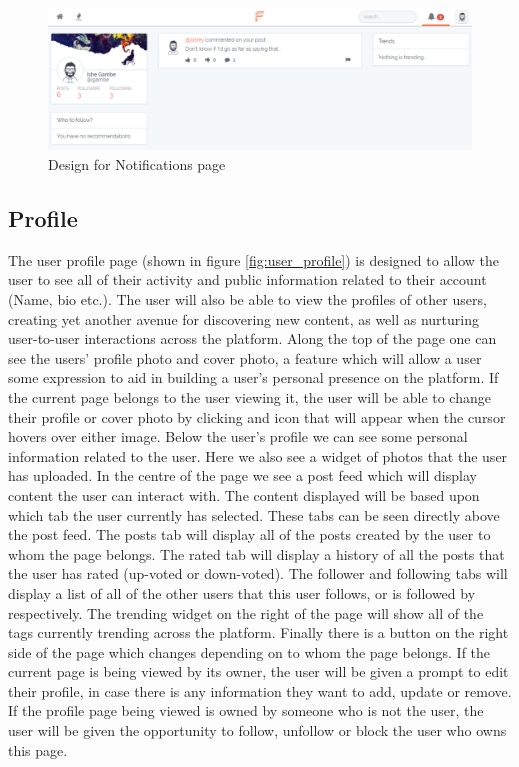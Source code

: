 \begin{figure}[H]
\centering
\includegraphics[width=1\linewidth]{Images/Design/notifications-page}
\caption{Design for Notifications page}
\label{fig:notifications-page}
\end{figure}

\subsection{Profile}
The user profile page (shown in figure \ref{fig:user_profile}) is designed to allow the user to see all of their activity and public information related to their account (Name, bio etc.). The user will also be able to view the profiles of other users, creating yet another avenue for discovering new content, as well as nurturing user-to-user interactions across the platform. Along the top of the page one can see the users' profile photo and cover photo, a feature which will allow a user some expression to aid in building a user's personal presence on the platform. If the current page belongs to the user viewing it, the user will be able to change their profile or cover photo by clicking and icon that will appear when the cursor hovers over either image. Below the user's profile we can see some personal information related to the user. Here we also see a widget of photos that the user has uploaded. In the centre of the page we see a post feed which will display content the user can interact with. The content displayed will be based upon which tab the user currently has selected. These tabs can be seen directly above the post feed. The posts tab will display all of the posts created by the user to whom the page belongs. The rated tab will display a history of all the posts that the user has rated (up-voted or down-voted). The follower and following tabs will display a list of all of the other users that this user follows, or is followed by respectively. The trending widget on the right of the page will show all of the tags currently trending across the platform. Finally there is a button on the right side of the page which changes depending on to whom the page belongs. If the current page is being viewed by its owner, the user will be given a prompt to edit their profile, in case there is any information they want to add, update or remove. If the profile page being viewed is owned by someone who is not the user, the user will be given the opportunity to follow, unfollow or block the user who owns this page.


